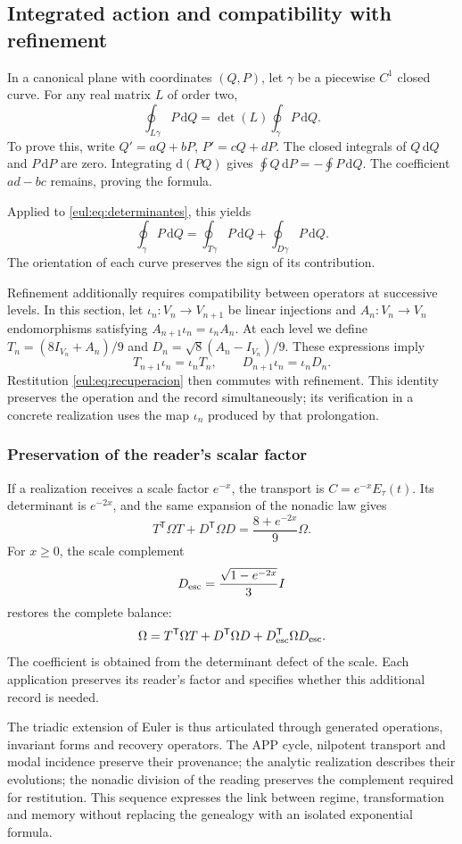 \subsection{Integrated action and compatibility with refinement}
\label{eul:accion-refinamiento}

In a canonical plane with coordinates \((Q,P)\), let \(\gamma\) be a piecewise \(C^1\) closed curve. For any real matrix \(L\) of order two,
\begin{equation}
 \oint_{L\gamma}P\,\mathrm dQ
 =\det(L)\oint_\gamma P\,\mathrm dQ.
\label{eul:eq:accion-determinante}
\end{equation}
To prove this, write \(Q'=aQ+bP\), \(P'=cQ+dP\). The closed integrals of \(Q\,\mathrm dQ\) and \(P\,\mathrm dP\) are zero. Integrating \(\mathrm d(PQ)\) gives \(\oint Q\,\mathrm dP=-\oint P\,\mathrm dQ\). The coefficient \(ad-bc\) remains, proving the formula.

Applied to \eqref{eul:eq:determinantes}, this yields
\[
 \oint_\gamma P\,\mathrm dQ
 =\oint_{T\gamma}P\,\mathrm dQ
  +\oint_{D\gamma}P\,\mathrm dQ.
\]
The orientation of each curve preserves the sign of its contribution.

Refinement additionally requires compatibility between operators at successive levels. In this section, let \(\iota_n:V_n\to V_{n+1}\) be linear injections and \(A_n:V_n\to V_n\) endomorphisms satisfying \(A_{n+1}\iota_n=\iota_nA_n\). At each level we define \(T_n=(8I_{V_n}+A_n)/9\) and \(D_n=\sqrt8(A_n-I_{V_n})/9\). These expressions imply
\[
 T_{n+1}\iota_n=\iota_nT_n,
 \qquad D_{n+1}\iota_n=\iota_nD_n.
\]
Restitution \eqref{eul:eq:recuperacion} then commutes with refinement. This identity preserves the operation and the record simultaneously; its verification in a concrete realization uses the map \(\iota_n\) produced by that prolongation.

\subsubsection{Preservation of the reader's scalar factor}

If a realization receives a scale factor \(e^{-x}\), the transport is \(C=e^{-x}E_\tau(t)\). Its determinant is \(e^{-2x}\), and the same expansion of the nonadic law gives
\[
 T^\mathsf T\Omega T+D^\mathsf T\Omega D
 =\frac{8+e^{-2x}}9\Omega.
\]
For \(x\ge0\), the scale complement
\[
 D_{\rm esc}=\frac{\sqrt{1-e^{-2x}}}{3}I
\]
restores the complete balance:
\[
 \Omega=T^\mathsf T\Omega T+D^\mathsf T\Omega D
       +D_{\rm esc}^\mathsf T\Omega D_{\rm esc}.
\]
The coefficient is obtained from the determinant defect of the scale. Each application preserves its reader's factor and specifies whether this additional record is needed.

The triadic extension of Euler is thus articulated through generated operations, invariant forms and recovery operators. The APP cycle, nilpotent transport and modal incidence preserve their provenance; the analytic realization describes their evolutions; the nonadic division of the reading preserves the complement required for restitution. This sequence expresses the link between regime, transformation and memory without replacing the genealogy with an isolated exponential formula.
